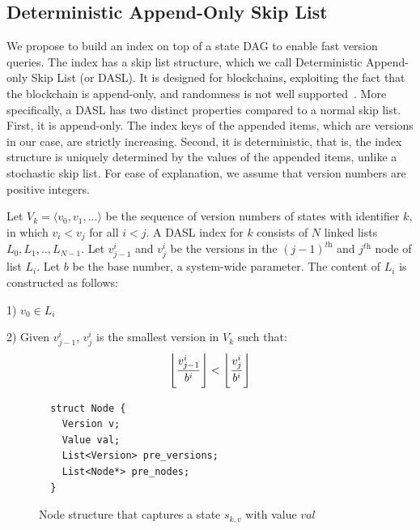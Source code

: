 \subsection{Deterministic Append-Only Skip List} 
We propose to build an index on top of a state DAG to enable fast version queries. The index has a skip list
structure, which we call Deterministic Append-only Skip List (or DASL). It is designed for blockchains,
exploiting the fact that the blockchain is append-only, and randomness is not well
supported~\cite{cachin2016non}. More specifically, a DASL has two distinct properties compared to a normal skip
list. First, it is append-only. The index keys of the appended items, which are versions in our case, are
strictly increasing. Second, it is deterministic, that is,
the index structure is uniquely determined by the values of the appended items, unlike a stochastic skip list.
For ease of explanation, we assume that version numbers are positive integers.

\begin{definition}\label{def:1}
  Let $V_k = \langle v_0, v_1, ...\rangle$ be the sequence of version numbers of states with identifier $k$, in which $v_i <
  v_j$ for all $i<j$. A DASL index for $k$ consists of $N$ linked lists $L_0, L_1,.., L_{N-1}$. Let $v^{i}_{j-1}$ and $v^i_j$ be
  the versions in the $(j-1)^{\textit{th}}$ and $j^{\textit{th}}$ node of list $L_i$. Let $b$ be the base number, a system-wide parameter. The content
  of $L_i$ is constructed as follows:
 
  1) $v_0 \in L_i$

  2) Given $v^i_{j-1}$, $v^i_j$ is the smallest version in $V_k$ such that: 
  \begin{equation}\label{eq:4}
    \floor*{\frac{v^i_{j-1}}{b^i}} < \floor*{\frac{v^i_j}{b^i}}
  \end{equation}
\end{definition}

\begin{figure}
  \centering
  \footnotesize
  \begin{verbatim}
  struct Node {
    Version v;
    Value val;
    List<Version> pre_versions;
    List<Node*> pre_nodes;
  }
  \end{verbatim}
  \caption{Node structure that captures a state $s_{k,v}$ with value $val$}
  \label{code:prov:node}
\end{figure} 

